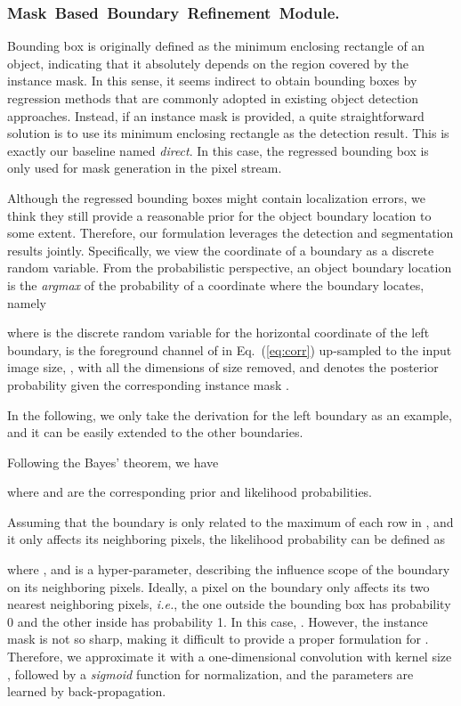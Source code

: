 \documentclass[letterpaper]{article} \usepackage{aaai20}  \usepackage{times}  \usepackage{helvet} \usepackage{courier}  \usepackage[hyphens]{url}  \usepackage{graphicx} \urlstyle{rm} \def\UrlFont{\rm}  \usepackage{graphicx}  \frenchspacing  \setlength{\pdfpagewidth}{8.5in}  \setlength{\pdfpageheight}{11in}
\newcommand{\ie}{\textit{i.e.}}
\begin{document}
\subsubsection{Mask~Based~Boundary~Refinement~Module.}
Bounding box is originally defined as the minimum enclosing rectangle of an object, indicating that it absolutely depends on the region covered by the instance mask. In this sense, it seems indirect to obtain bounding boxes by regression methods that are commonly adopted in existing object detection approaches. Instead, if an instance mask is provided, a quite straightforward solution is to use its minimum enclosing rectangle as the detection result. This is exactly our baseline named \textit{direct}. In this case, the regressed bounding box is only used for mask generation in the pixel stream. 

Although the regressed bounding boxes might contain localization errors, we think they still provide a reasonable prior for the object boundary location to some extent. Therefore, our formulation leverages the detection and segmentation results jointly. Specifically, we view the coordinate of a boundary as a discrete random variable. From the probabilistic perspective, an object boundary location is the \textit{argmax} of the probability of a coordinate where the boundary locates, namely

where  is the discrete random variable for the horizontal coordinate of the left boundary,  is the foreground channel of  in Eq.~(\ref{eq:corr}) up-sampled to the input image size, , with all the dimensions of size  removed, and  denotes the posterior probability given the corresponding instance mask .

In the following, we only take the derivation for the left boundary as an example, and it can be easily extended to the other boundaries.

Following the Bayes' theorem, we have

where  and  are the corresponding prior and likelihood probabilities.

Assuming that the boundary is only related to the maximum of each row in , and it only affects its neighboring pixels, the likelihood probability can be defined as

where , and  is a hyper-parameter, describing the influence scope of the boundary on its neighboring pixels. Ideally, a pixel on the boundary only affects its two nearest neighboring pixels, \ie, the one outside the bounding box has probability 0 and the other inside has probability 1. In this case, . However, the instance mask is not so sharp, making it difficult to provide a proper formulation for . Therefore, we approximate it with a one-dimensional convolution with kernel size , followed by a \textit{sigmoid} function for normalization, and the parameters are learned by back-propagation. 
\end{document}
